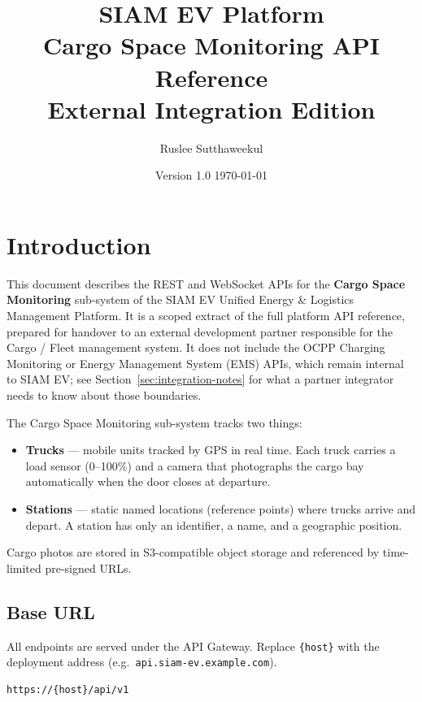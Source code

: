 \documentclass{article}
\title{%
    \textbf{SIAM EV Platform}\\[6pt]
    \large Cargo Space Monitoring API Reference\\
    \normalsize External Integration Edition
}
\author{Ruslee Sutthaweekul}
\date{Version 1.0 \quad\textbullet\quad \today}
\begin{document}
\maketitle
\tableofcontents
\newpage

\section{Introduction}

This document describes the REST and WebSocket APIs for the \textbf{Cargo Space
Monitoring} sub-system of the SIAM EV Unified Energy \& Logistics Management
Platform. It is a scoped extract of the full platform API reference, prepared
for handover to an external development partner responsible for the Cargo /
Fleet management system. It does not include the OCPP Charging Monitoring or
Energy Management System (EMS) APIs, which remain internal to SIAM EV; see
Section~\ref{sec:integration-notes} for what a partner integrator needs to know
about those boundaries.

The Cargo Space Monitoring sub-system tracks two things:

\begin{itemize}
    \item \textbf{Trucks} --- mobile units tracked by GPS in real time. Each truck
          carries a load sensor (0--100\%) and a camera that photographs the cargo
          bay automatically when the door closes at departure.
    \item \textbf{Stations} --- static named locations (reference points) where
          trucks arrive and depart. A station has only an identifier, a name, and
          a geographic position.
\end{itemize}

\noindent Cargo photos are stored in S3-compatible object storage and referenced
by time-limited pre-signed URLs.

\subsection{Base URL}

All endpoints are served under the API Gateway. Replace \texttt{\{host\}} with the
deployment address (e.g.\ \texttt{api.siam-ev.example.com}).

\begin{lstlisting}[language=bash, caption=Base URL pattern]
https://{host}/api/v1
\end{lstlisting}
\end{document}
